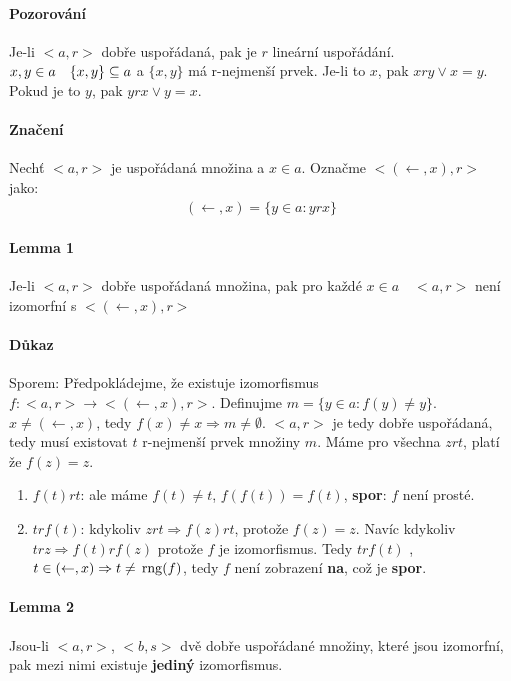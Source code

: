 \documentclass[a4paper,12pt,titlepage]{article}
\begin{document}
\paragraph{Pozorování}
Je-li $<a,r>$ dobře uspořádaná, pak je $r$ lineární uspořádání.
$x,y \in a \quad \{x,y\} \subseteq a$ a $\{x,y\}$ má r-nejmenší prvek. Je-li to
$x$,
pak $x r y \lor x = y$. Pokud je to $y$, pak $y r x \lor y = x$.
\paragraph{Značení}
Nechť $<a,r>$ je uspořádaná množina a $x \in a$. Označme $<(\leftarrow, x), r>$
jako:
\begin{align}
	(\leftarrow, x) = \{ y \in a : y r x \}
\end{align}
\paragraph{Lemma 1}
Je-li $<a,r>$ dobře uspořádaná množina, pak pro každé $x \in a \quad <a, r>$ není
izomorfní s $<(\leftarrow, x), r>$
\paragraph{Důkaz}
Sporem: Předpokládejme, že existuje izomorfismus $f: <a,r> \to <(\leftarrow, x),
r>$. Definujme $m = \{ y \in a: f(y) \neq y \}$. $x \neq (\leftarrow, x)$, tedy
$f(x) \neq x\Rightarrow m \neq \emptyset$. $<a,r>$ je tedy dobře uspořádaná,
tedy musí existovat $t$ r-nejmenší prvek množiny $m$. Máme pro všechna $z r t$,
platí že $f(z) = z$.
\begin{enumerate}
	\item $f(t) r t$: ale máme $f(t) \neq t$, $f(f(t)) = f(t)$,
	\textbf{spor}: $f$ není prosté.
	\item $t r f(t)$: kdykoliv $z r t \Rightarrow f(z) r t$, protože $f(z) = z$.
	Navíc kdykoliv $t r z \Rightarrow f(t) r f(z)$ protože $f$ je izomorfismus.
	Tedy $t r f(t)$ , $t \in (\leftarrow, x) \Rightarrow t \neq \operatorname*{\,rng}(f)$, tedy
	$f$ není zobrazení \textbf{na}, což je \textbf{spor}.
\end{enumerate}
\paragraph{Lemma 2}
Jsou-li $<a,r>$, $<b,s>$ dvě dobře uspořádané množiny, které jsou izomorfní, pak
mezi nimi existuje \textbf{jediný} izomorfismus.
\end{document}
